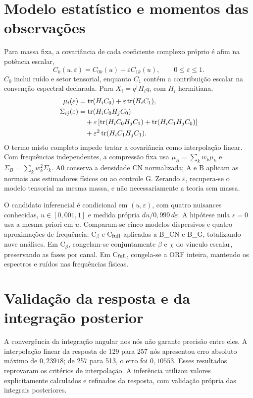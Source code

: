 \section{Modelo estatístico e momentos das observações}

Para massa fixa, a covariância de cada coeficiente complexo próprio é afim na potência escalar,
\begin{equation}
 C_k(u,\varepsilon)=C_{0k}(u)+\varepsilon C_{1k}(u),\qquad 0\leq\varepsilon\leq1.
\end{equation}
$C_0$ inclui ruído e setor tensorial, enquanto $C_1$ contém a contribuição escalar na convenção espectral declarada. Para $X_i=q^\dagger H_iq$, com $H_i$ hermitiana,
\begin{align}
 \mu_i(\varepsilon)&=\operatorname{tr}(H_iC_0)+\varepsilon\operatorname{tr}(H_iC_1),\\
 \Sigma_{ij}(\varepsilon)&=\operatorname{tr}(H_iC_0H_jC_0)\notag\\
 &\quad
 +\varepsilon\left[\operatorname{tr}(H_iC_0H_jC_1)+\operatorname{tr}(H_iC_1H_jC_0)\right]\notag
 \\
 &\quad +\varepsilon^2\operatorname{tr}(H_iC_1H_jC_1).
\end{align}
O termo misto completo impede tratar a covariância como interpolação linear. Com frequências independentes, a compressão fixa usa $\mu_B=\sum_k w_k\mu_k$ e $\Sigma_B=\sum_k w_k^2\Sigma_k$. A0 conserva a densidade CN normalizada; A e B aplicam as normais aos estimadores físicos ou ao controle G. Zerando $\varepsilon$, recupera-se o modelo tensorial na mesma massa, e não necessariamente a teoria sem massa.

O candidato inferencial é condicional em $(u,\varepsilon)$, com quatro nuisances conhecidas, $u\in[0{,}001,1]$ e medida própria $du/0{,}999\,d\varepsilon$. A hipótese nula $\varepsilon=0$ usa a mesma priori em $u$. Comparam-se cinco modelos dispersivos e quatro aproximações de frequência: C$_\beta$ e C$_{\rm full}$ aplicadas a B\_CN e B\_G, totalizando nove análises. Em C$_\beta$, congelam-se conjuntamente $\beta$ e $\chi$ do vínculo escalar, preservando as fases por canal. Em C$_{\rm full}$, congela-se a ORF inteira, mantendo os espectros e ruídos nas frequências físicas.

\section{Validação da resposta e da integração posterior}

A convergência da integração angular nos nós não garante precisão entre eles. A interpolação linear da resposta de 129 para 257 nós apresentou erro absoluto máximo de $0{,}23918$; de 257 para 513, o erro foi $0{,}10553$. Esses resultados reprovaram os critérios de interpolação. A inferência utilizou valores explicitamente calculados e refinados da resposta, com validação própria das integrais posteriores.

